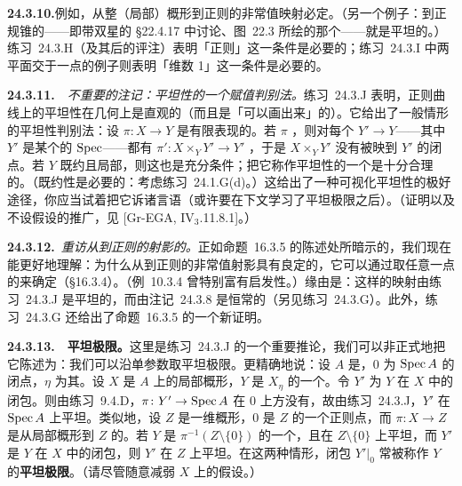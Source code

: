 \textbf{24.3.10.}\quad 例如，从整（局部\trNoether）概形到正则\trCurve{}的非常值映射必定\trFlat。（另一个例子：到正规锥的\trDeformation——即带双星的 \S22.4.17 中讨论、\mbox{图~22.3} 所绘的那个——就是平坦的。）\mbox{练习~24.3.H}（及其后的评注）表明「正则」这一条件是必要的；\mbox{练习~24.3.I} 中两平面交于一点的例子则表明「维数 1」这一条件是必要的。

\textbf{24.3.11.}\ \hard\ \emph{不重要的注记：平坦性的一个赋值判别法。}\quad \mbox{练习~24.3.J} 表明，正则曲线上的平坦性在几何上是直观的（而且是「可以画出来」的）。它给出了一般情形的平坦性判别法：设 $\pi\colon X\to Y$ 是有限表现的\trMorphism。若 $\pi$ \trFlat，则对每个\trMorphism{} $Y'\to Y$——其中 $Y'$ 是某个\trDVR{}的 $\operatorname{Spec}$——都有 $\pi'\colon X\times_Y Y'\to Y'$ \trFlat，于是 $X\times_Y Y'$ 没有\trAssociatedPoint{}被映到 $Y'$ 的闭点。若 $Y$ 既约且局部\trNoether，则这也是充分条件；把它称作平坦性的一个\emph{\trValuativeCriteria}是十分合理的。（既约性是必要的：考虑\mbox{练习~24.1.G}(d)。）这给出了一种可视化平坦性的极好途径，你应当试着把它诉诸言语（或许要在下文学习了平坦极限之后）。（证明以及不设\trNoether{}假设的推广，见 [Gr-EGA, IV$_3$.11.8.1]。）

\textbf{24.3.12.}\ \emph{重访从\trCurve{}到正则\trCurve{}的射影\trMorphism{}的\trDegree。}\quad 正如\mbox{命题~16.3.5} 的陈述处所暗示的，我们现在能更好地理解：为什么从\trCurve{}到正则\trCurve{}的非常值射影\trMorphism{}具有良定的\trDegree，它可以通过取任意一点的\trInverseImage{}来确定（\S16.3.4）。（\mbox{例~10.3.4} 曾特别富有启发性。）缘由是：这样的映射由\mbox{练习~24.3.J} 是平坦的，而\trDegree{}由\mbox{注记~24.3.8} 是恒常的（另见\mbox{练习~24.3.G}）。此外，\mbox{练习~24.3.G} 还给出了\mbox{命题~16.3.5} 的一个新证明。

\textbf{24.3.13.}\ \hard\ \textbf{平坦极限。}\quad 这里是\mbox{练习~24.3.J} 的一个重要推论，我们可以非正式地把它陈述为：我们可以沿单参数\trFamily{}取平坦极限。更精确地说：设 $A$ 是\trDVR，$0$ 为 $\operatorname{Spec} A$ 的闭点，$\eta$ 为其\trGenericPoint。设 $X$ 是 $A$ 上的局部\trNoether{}概形，$Y$ 是 $X_\eta$ 的一个\trClosedSubscheme。令 $Y'$ 为 $Y$ 在 $X$ 中的\trSchemeTheoretic{}闭包。则由\mbox{练习~9.4.D}，$\pi\colon Y'\to\operatorname{Spec} A$ 在 $0$ 上方没有\trAssociatedPoint，故由\mbox{练习~24.3.J}，$Y'$ 在 $\operatorname{Spec} A$ 上平坦。类似地，设 $Z$ 是一维\trNoether{}概形，$0$ 是 $Z$ 的一个正则点，而 $\pi\colon X\to Z$ 是从局部\trNoether{}概形到 $Z$ 的\trMorphism。若 $Y$ 是 $\pi^{-1}(Z\setminus\{0\})$ 的一个\trClosedSubscheme，且在 $Z\setminus\{0\}$ 上平坦，而 $Y'$ 是 $Y$ 在 $X$ 中的\trSchemeTheoretic{}闭包，则 $Y'$ 在 $Z$ 上平坦。在这两种情形，闭包 $Y'|_0$ 常被称作 $Y$ 的\textbf{平坦极限}。（请尽管随意减弱 $X$ 上的\trNoether{}假设。）

